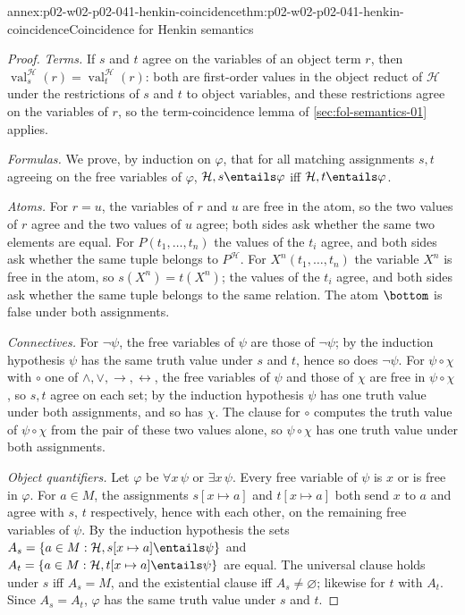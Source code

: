 \begin{annexitem}{annex:p02-w02-p02-041-henkin-coincidence}{thm:p02-w02-p02-041-henkin-coincidence}{Coincidence for Henkin semantics}
\begin{proof}
\emph{Terms.}  If \(s\) and \(t\) agree on the variables of an object term
\(r\), then \(\operatorname{val}^{\mathcal H}_s(r)=\operatorname{val}^{\mathcal
H}_t(r)\): both are first-order values in the object reduct of
\(\mathcal H\) under the restrictions of \(s\) and \(t\) to object variables,
and these restrictions agree on the variables of \(r\), so
the term-coincidence lemma of \cref{sec:fol-semantics-01} applies.

\emph{Formulas.}  We prove, by induction on \(\varphi\), that for all matching
assignments \(s,t\) agreeing on the free variables of \(\varphi\),
\(\mathcal H,s\entails\varphi\) iff \(\mathcal H,t\entails\varphi\).

\emph{Atoms.}  For \(r=u\), the variables of \(r\) and \(u\) are free in the
atom, so the two values of \(r\) agree and the two values of \(u\) agree; both
sides ask whether the same two elements are equal.  For \(P(t_1,\ldots,t_n)\)
the values of the \(t_i\) agree, and both sides ask whether the same tuple
belongs to \(P^{\mathcal H}\).  For \(X^n(t_1,\ldots,t_n)\) the variable
\(X^n\) is free in the atom, so \(s(X^n)=t(X^n)\); the values of the \(t_i\)
agree, and both sides ask whether the same tuple belongs to the same relation.
The atom \(\bottom\) is false under both assignments.

\emph{Connectives.}  For \(\neg\psi\), the free variables of \(\psi\) are
those of \(\neg\psi\); by the induction hypothesis \(\psi\) has the same truth
value under \(s\) and \(t\), hence so does \(\neg\psi\).  For
\(\psi\circ\chi\) with \(\circ\) one of \(\land,\lor,\to,\leftrightarrow\),
the free variables of \(\psi\) and those of \(\chi\) are free in
\(\psi\circ\chi\), so \(s,t\) agree on each set; by the induction hypothesis
\(\psi\) has one truth value under both assignments, and so has \(\chi\).  The
clause for \(\circ\) computes the truth value of \(\psi\circ\chi\) from the
pair of these two values alone, so \(\psi\circ\chi\) has one truth value under
both assignments.

\emph{Object quantifiers.}  Let \(\varphi\) be \(\forall x\,\psi\) or
\(\exists x\,\psi\).  Every free variable of \(\psi\) is \(x\) or is free in
\(\varphi\).  For \(a\in M\), the assignments \(s[x\mapsto a]\) and
\(t[x\mapsto a]\) both send \(x\) to \(a\) and agree with \(s\), \(t\)
respectively, hence with each other, on the remaining free variables of
\(\psi\).  By the induction hypothesis the sets
\(A_s=\{a\in M:\mathcal H,s[x\mapsto a]\entails\psi\}\) and
\(A_t=\{a\in M:\mathcal H,t[x\mapsto a]\entails\psi\}\) are equal.  The
universal clause holds under \(s\) iff \(A_s=M\), and the existential clause
iff \(A_s\ne\varnothing\); likewise for \(t\) with \(A_t\).  Since
\(A_s=A_t\), \(\varphi\) has the same truth value under \(s\) and \(t\).


\end{proof}
\end{annexitem}
